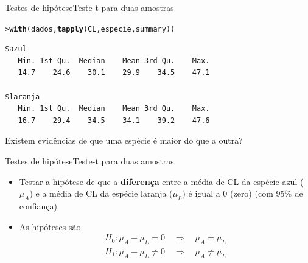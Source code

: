 \documentclass[10pt]{beamer}\usepackage{graphicx, color}
\makeatletter
\newcommand{\hlfunctioncall}[1]{\textcolor[rgb]{0,0,0.545098039215686}{\textbf{#1}}}%
\newenvironment{kframe}{%
 \def\at@end@of@kframe{}%
 \ifinner\ifhmode%
  \def\at@end@of@kframe{\end{minipage}}%
  \begin{minipage}{\columnwidth}%
 \fi\fi%
 \def\FrameCommand##1{\hskip\@totalleftmargin \hskip-\fboxsep
 \colorbox{shadecolor}{##1}\hskip-\fboxsep
     \hskip-\linewidth \hskip-\@totalleftmargin \hskip\columnwidth}%
 \MakeFramed {\advance\hsize-\width
   \@totalleftmargin\z@ \linewidth\hsize
   \@setminipage}}%
 {\par\unskip\endMakeFramed%
 \at@end@of@kframe}
\newenvironment{knitrout}{}{} %
\makeatother
\begin{document}
\begin{frame}[fragile=singleslide]{Testes de hipótese}{Teste-t para duas amostras}
\begin{knitrout}\small
{}\color{fgcolor}\begin{kframe}
\begin{alltt}
> \hlfunctioncall{with}(dados, \hlfunctioncall{tapply}(CL, especie, summary))
\end{alltt}
\begin{verbatim}
$azul
   Min. 1st Qu.  Median    Mean 3rd Qu.    Max. 
   14.7    24.6    30.1    29.9    34.5    47.1 

$laranja
   Min. 1st Qu.  Median    Mean 3rd Qu.    Max. 
   16.7    29.4    34.5    34.1    39.2    47.6 

\end{verbatim}
\end{kframe}
\end{knitrout}

Existem evidências de que uma espécie é maior do que a outra?
\end{frame}

\begin{frame}[fragile=singleslide]{Testes de hipótese}{Teste-t para duas amostras}
  \begin{itemize}
  \item Testar a hipótese de que a \textbf{diferença} entre a média de
    CL da espécie azul ($\mu_A$) e a média de CL da espécie laranja
    ($\mu_L$) é igual a 0 (zero) (com 95\% de confiança)
  \item As hipóteses são
    \begin{align*}
      H_0: \mu_A - \mu_L = 0 \quad \Rightarrow \quad \mu_A = \mu_L \\
      H_1: \mu_A - \mu_L \neq 0 \quad \Rightarrow \quad \mu_A \neq \mu_L
    \end{align*}
  \end{itemize}
\end{frame}
\end{document}
